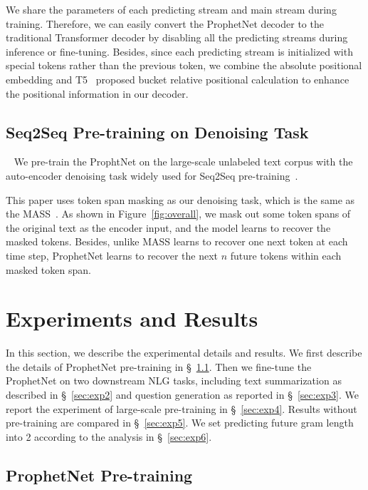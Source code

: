 \documentclass[11pt,a4paper]{article}
\begin{document}
We share the parameters of each predicting stream and main stream during training. 
Therefore, we can easily convert the ProphetNet decoder to the traditional Transformer decoder by disabling all the predicting streams during inference or fine-tuning. Besides, since each predicting stream is initialized with special tokens rather than the previous token, we combine the absolute positional embedding and T5~\cite{raffel2019exploring} proposed bucket relative positional calculation to enhance the positional information in our decoder. 

\subsection{Seq2Seq Pre-training on Denoising Task}~\label{sec:m4}
We pre-train the ProphtNet on the large-scale unlabeled text corpus with the auto-encoder denoising task widely used for Seq2Seq pre-training~\cite{song2019mass, lewis2019bart, raffel2019exploring}. 




This paper uses token span masking as our denoising task, which is the same as the MASS~\cite{song2019mass}.
As shown in Figure~\ref{fig:overall}, we mask out some token spans of the original text as the encoder input, and the model learns to recover the masked tokens.
Besides, unlike MASS learns to recover one next token at each time step, ProphetNet learns to recover the next $n$ future tokens within each masked token span.


\section{Experiments and Results}
In this section, we describe the experimental details and results.
We first describe the details of ProphetNet pre-training in \S~\ref{sec:exp1}.
Then we fine-tune the ProphetNet on two downstream NLG tasks, including text summarization as described in \S~\ref{sec:exp2} and question generation as reported in \S~\ref{sec:exp3}.
We report the experiment of large-scale pre-training in \S~\ref{sec:exp4}. Results without pre-training are compared in \S~\ref{sec:exp5}. We set predicting future gram length into 2 according to the analysis in \S~\ref{sec:exp6}.


\subsection{ProphetNet Pre-training}\label{sec:exp1}
\end{document}
